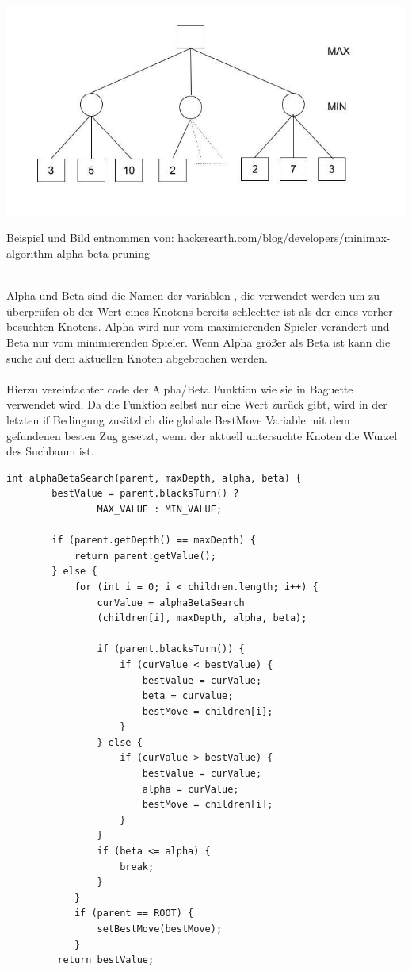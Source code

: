 \includegraphics[scale=0.5]{alpha-beta-pruning.jpg}\\
\begin{tiny}
Beispiel und Bild entnommen von: hackerearth.com/blog/developers/minimax-algorithm-alpha-beta-pruning
\end{tiny}\\
Alpha und Beta sind die Namen der variablen , die verwendet werden um zu überprüfen ob der Wert eines Knotens bereits schlechter ist als der eines vorher besuchten Knotens. Alpha wird nur vom maximierenden Spieler verändert und Beta nur vom minimierenden Spieler.
Wenn Alpha größer als Beta ist kann die suche auf dem aktuellen Knoten abgebrochen werden.
\\\\
Hierzu vereinfachter code der Alpha/Beta Funktion wie sie in Baguette verwendet wird. Da die Funktion selbst nur eine Wert zurück gibt, wird in der letzten if Bedingung zusätzlich die globale BestMove Variable mit dem gefundenen besten Zug gesetzt, wenn der aktuell untersuchte Knoten die Wurzel des Suchbaum ist.
\begin{lstlisting}[frame=single]
int alphaBetaSearch(parent, maxDepth, alpha, beta) {
        bestValue = parent.blacksTurn() ?
                MAX_VALUE : MIN_VALUE;

        if (parent.getDepth() == maxDepth) {
            return parent.getValue();
        } else {
            for (int i = 0; i < children.length; i++) {
                curValue = alphaBetaSearch
                (children[i], maxDepth, alpha, beta);

                if (parent.blacksTurn()) {
                    if (curValue < bestValue) {
                        bestValue = curValue;
                        beta = curValue;
                        bestMove = children[i];
                    }
                } else {
                    if (curValue > bestValue) {
                        bestValue = curValue;
                        alpha = curValue;
                        bestMove = children[i];
                    }
                }
                if (beta <= alpha) {
                    break;
                }
            }
            if (parent == ROOT) {
                setBestMove(bestMove);
            }
         return bestValue;
\end{lstlisting}

